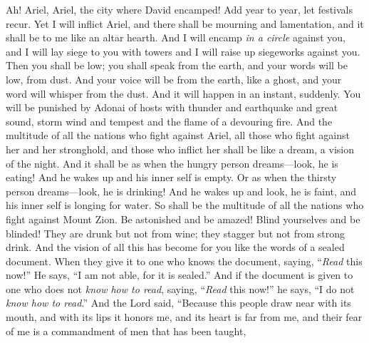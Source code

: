\begin{biblechapter} %
 Ah! Ariel, Ariel, the city where David encamped!
\verse Add year to year, 
let festivals recur.
\verse Yet I will inflict Ariel, 
and there shall be mourning and lamentation, 
and it shall be to me like an altar hearth.
\verse And I will encamp \textit{in a circle} against you, 
and I will lay siege to you with towers 
and I will raise up siegeworks against you.
\verse Then you shall be low; 
you shall speak from the earth, 
and your words will be low, from dust. 
And your voice will be from the earth, like a ghost, 
and your word will whisper from the dust. And it will happen in an instant, suddenly.
\verse You will be punished by Adonai of hosts
\verse with thunder and earthquake and great sound, 
storm wind and tempest and the flame of a devouring fire.
\verse And the multitude of all the nations who fight against Ariel, 
all those who fight against her and her stronghold, 
and those who inflict her shall be like a dream, a vision of the night.
\verse And it shall be as when the hungry person dreams—look, he is eating! 
And he wakes up and his inner self is empty. 
Or as when the thirsty person dreams—look, he is drinking! 
And he wakes up and look, he is faint, 
and his inner self is longing for water. 
So shall be the multitude of all the nations who fight against Mount Zion.
\verse Be astonished and be amazed! 
Blind yourselves and be blinded! 
They are drunk but not from wine; 
they stagger but not from strong drink.
\verse And the vision of all this has become for you like the words of a sealed document. When they give it to one who knows the document, saying, “\textit{Read} this now!” He says, “I am not able, for it is sealed.”
\verse And if the document is given to one who does not \textit{know how to read}, saying, “\textit{Read} this now!” he says, “I do not \textit{know how to read}.”
\verse And the Lord said, “Because this people draw near with its mouth, 
and with its lips it honors me, 
and its heart is far from me, 
and their fear of me is a commandment of men that has been taught,

\end{biblechapter}
